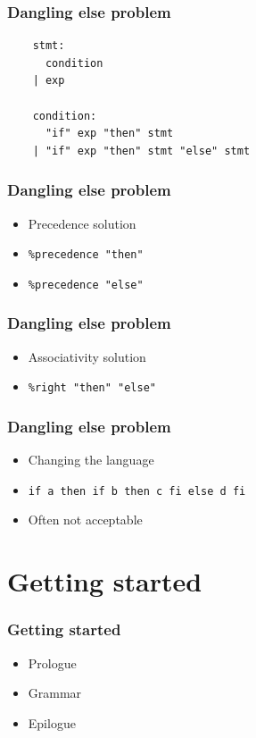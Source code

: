 \documentclass{beamer}
\begin{document}
\begin{frame}[fragile]
  \frametitle{Dangling else problem}
\begin{verbatim}
    stmt:
      condition
    | exp

    condition:
      "if" exp "then" stmt
    | "if" exp "then" stmt "else" stmt
\end{verbatim}
\end{frame}

\begin{frame}
  \frametitle{Dangling else problem}
    \begin{itemize}
      \item Precedence solution
      \item \texttt{\%precedence "then"}
      \item \texttt{\%precedence "else"}
    \end{itemize}
\end{frame}

\begin{frame}
  \frametitle{Dangling else problem}
    \begin{itemize}
      \item Associativity solution
      \item \texttt{\%right "then" "else"}
    \end{itemize}
\end{frame}

\begin{frame}
  \frametitle{Dangling else problem}
    \begin{itemize}
      \item Changing the language
      \item \texttt{if a then if b then c fi else d fi}
      \item Often not acceptable
    \end{itemize}
\end{frame}

\section{Getting started}

\begin{frame}
  \frametitle{Getting started}
    \begin{itemize}
      \item Prologue
      \item Grammar
      \item Epilogue
    \end{itemize}
\end{frame}
\end{document}
